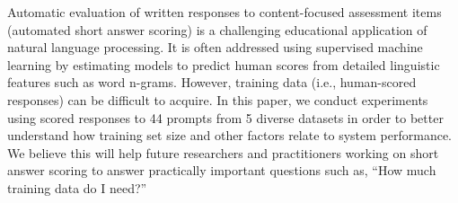 Automatic evaluation of written responses to content-focused assessment items (automated short answer scoring) is a challenging educational application of natural language processing. It is often addressed using supervised machine learning by estimating models to predict human scores from detailed linguistic features such as word n-grams. However, training data (i.e., human-scored responses) can be difficult to acquire. In this paper, we conduct experiments using scored responses to 44 prompts from 5 diverse datasets in order to better understand how training set size and other factors relate to system performance. We believe this will help future researchers and practitioners working on short answer scoring to answer practically important questions such as, ``How much training data do I need?''
